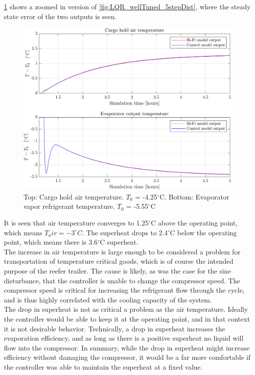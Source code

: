 \cref{fig:LQR_wellTuned_5stepDist_zoom} shows a zoomed in version of \cref{fig:LQR_wellTuned_5stepDist}, where the steady state error of the two outputs is seen.\\

\begin{figure}[h!]
	\centering
	\includegraphics[width=1\textwidth]{Graphics/fig_LQR_wellTuned_5stepDist_zoom.png}
	\caption{Top: Cargo hold air temperature. $T_0$ = -4.25$^{\circ}$C. Bottom: Evaporator vapor refrigerant temperature. $T_0$ = -5.55$^{\circ}$C}
	\label{fig:LQR_wellTuned_5stepDist_zoom}
\end{figure}

It is seen that air temperature converges to 1.25$^{\circ}$C above the operating point, which means $T_air = -3^{\circ}C$. The superheat drops to 2.4$^{\circ}$C below the operating point, which means there is 3.6$^{\circ}$C superheat.\\

The increase in air temperature is large enough to be considered a problem for transportation of temperature critical goods, which is of course the intended purpose of the reefer trailer. The cause is likely, as was the case for the sine disturbance, that the controller is unable to change the compressor speed. The compressor speed is critical for increasing the refrigerant flow through the cycle, and is thus highly correlated with the cooling capacity of the system. \\

The drop in superheat is not as critical a problem as the air temperature. Ideally the controller would be able to keep it at the operating point, and in that context it is not desirable behavior. Technically, a drop in superheat increases the evaporation efficiency, and as long as there is a positive superheat no liquid will flow into the compressor. In summary, while the drop in superheat might increase efficiency without damaging the compressor, it would be a far more comfortable if the controller was able to maintain the superheat at a fixed value.

